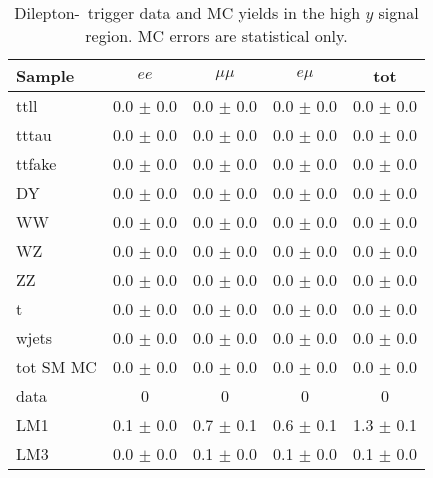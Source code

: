 \begin{table}[hbt]
\begin{center}
\footnotesize
\caption{\label{tab:lowptsigyield2} Dilepton-\Ht\ trigger data and MC yields in the high $y$ signal region.
MC errors are statistical only.}
\begin{tabular}{l|cccc}
\hline
         Sample   &           $ee$   &       $\mu\mu$   &         $e\mu$   &            tot  \\
\hline
           ttll   &  0.0 $\pm$ 0.0   &  0.0 $\pm$ 0.0   &  0.0 $\pm$ 0.0   &  0.0 $\pm$ 0.0  \\
          tttau   &  0.0 $\pm$ 0.0   &  0.0 $\pm$ 0.0   &  0.0 $\pm$ 0.0   &  0.0 $\pm$ 0.0  \\
         ttfake   &  0.0 $\pm$ 0.0   &  0.0 $\pm$ 0.0   &  0.0 $\pm$ 0.0   &  0.0 $\pm$ 0.0  \\
             DY   &  0.0 $\pm$ 0.0   &  0.0 $\pm$ 0.0   &  0.0 $\pm$ 0.0   &  0.0 $\pm$ 0.0  \\
             WW   &  0.0 $\pm$ 0.0   &  0.0 $\pm$ 0.0   &  0.0 $\pm$ 0.0   &  0.0 $\pm$ 0.0  \\
             WZ   &  0.0 $\pm$ 0.0   &  0.0 $\pm$ 0.0   &  0.0 $\pm$ 0.0   &  0.0 $\pm$ 0.0  \\
             ZZ   &  0.0 $\pm$ 0.0   &  0.0 $\pm$ 0.0   &  0.0 $\pm$ 0.0   &  0.0 $\pm$ 0.0  \\
              t   &  0.0 $\pm$ 0.0   &  0.0 $\pm$ 0.0   &  0.0 $\pm$ 0.0   &  0.0 $\pm$ 0.0  \\
          wjets   &  0.0 $\pm$ 0.0   &  0.0 $\pm$ 0.0   &  0.0 $\pm$ 0.0   &  0.0 $\pm$ 0.0  \\
\hline
      tot SM MC   &  0.0 $\pm$ 0.0   &  0.0 $\pm$ 0.0   &  0.0 $\pm$ 0.0   &  0.0 $\pm$ 0.0  \\
\hline
           data   &              0   &              0   &              0   &              0  \\
\hline
            LM1   &  0.1 $\pm$ 0.0   &  0.7 $\pm$ 0.1   &  0.6 $\pm$ 0.1   &  1.3 $\pm$ 0.1  \\
            LM3   &  0.0 $\pm$ 0.0   &  0.1 $\pm$ 0.0   &  0.1 $\pm$ 0.0   &  0.1 $\pm$ 0.0  \\
\hline
\end{tabular}
\end{center}
\end{table}

